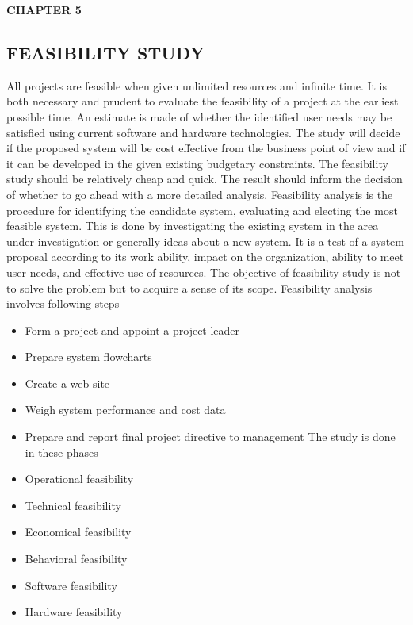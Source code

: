 \documentclass[12pt]{article}
\begin{document}
\newpage
\begin{flushleft}\textbf{CHAPTER 5} \end{flushleft}
\begin{flushleft}\section{FEASIBILITY STUDY} \end{flushleft}
\vspace*{10px}
All projects are feasible when given unlimited resources and infinite time. It is both
necessary and prudent to evaluate the feasibility of a project at the earliest possible
time. An estimate is made of whether the identified user needs may be satisfied using
current software and hardware technologies. The study will decide if the proposed
system will be cost effective from the business point of view and if it can be developed
in the given existing budgetary constraints. The feasibility study should be relatively
cheap and quick. The result should inform the decision of whether to go ahead with a
more detailed analysis. Feasibility analysis is the procedure for identifying the candidate
system, evaluating and electing the most feasible system. This is done by investigating
the existing system in the area under investigation or generally ideas about a new
system. It is a test of a system proposal according to its work ability, impact on the
organization, ability to meet user needs, and effective use of resources. The objective
of feasibility study is not to solve the problem but to acquire a sense of its scope.
Feasibility analysis involves following steps
\begin{itemize}
\item  Form a project and appoint a project leader
\item Prepare system flowcharts
\item Create a web site
\item Weigh system performance and cost data
\item Prepare and report final project directive to management The study is done in
these phases
\item Operational feasibility
\item Technical feasibility
\item Economical feasibility
\item Behavioral feasibility
\item Software feasibility
\item Hardware feasibility
\end{itemize}
\end{document}
